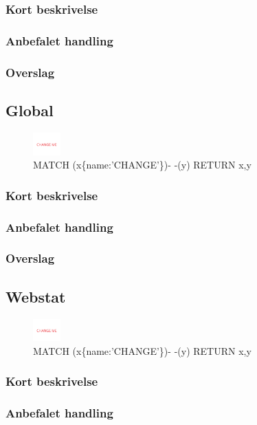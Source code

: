 \documentclass{article}
\begin{document}
\subsubsection{Kort beskrivelse}
\subsubsection{Anbefalet handling}
\subsubsection{Overslag}


\subsection{Global}
\begin{figure}[h]
\includegraphics[width=30pt]{CHANGE.PNG}
\caption{MATCH (x\{name:'CHANGE'\})- -(y) RETURN x,y}
\end{figure}
\subsubsection{Kort beskrivelse}
\subsubsection{Anbefalet handling}
\subsubsection{Overslag}


\subsection{Webstat}
\begin{figure}[h]
\includegraphics[width=30pt]{CHANGE.PNG}
\caption{MATCH (x\{name:'CHANGE'\})- -(y) RETURN x,y}
\end{figure}
\subsubsection{Kort beskrivelse}
\subsubsection{Anbefalet handling}
\end{document}
